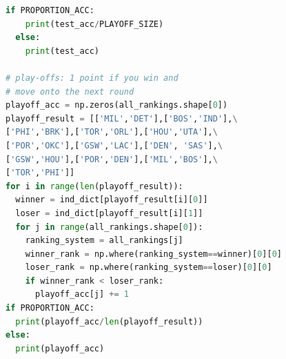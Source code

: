 \documentclass[12pt]{article}%
\begin{document}
\begin{lstlisting}[language=Python]
  if PROPORTION_ACC:
    print(test_acc/PLAYOFF_SIZE)
  else:
    print(test_acc)

# play-offs: 1 point if you win and 
# move onto the next round
playoff_acc = np.zeros(all_rankings.shape[0])
playoff_result = [['MIL','DET'],['BOS','IND'],\
['PHI','BRK'],['TOR','ORL'],['HOU','UTA'],\
['POR','OKC'],['GSW','LAC'],['DEN', 'SAS'],\
['GSW','HOU'],['POR','DEN'],['MIL','BOS'],\
['TOR','PHI']]
for i in range(len(playoff_result)):
  winner = ind_dict[playoff_result[i][0]]
  loser = ind_dict[playoff_result[i][1]]
  for j in range(all_rankings.shape[0]):
    ranking_system = all_rankings[j]
    winner_rank = np.where(ranking_system==winner)[0][0]
    loser_rank = np.where(ranking_system==loser)[0][0]
    if winner_rank < loser_rank:
      playoff_acc[j] += 1
if PROPORTION_ACC:
  print(playoff_acc/len(playoff_result))
else:
  print(playoff_acc)

\end{lstlisting}
\end{document}
